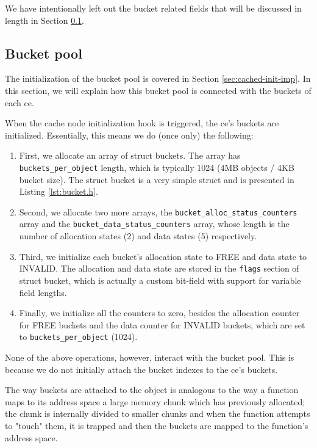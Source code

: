 We have intentionally left out the bucket related fields that will be discussed 
in length in Section \ref{sec:cached-bucket-imp}.

\subsection{Bucket pool}\label{sec:cached-bucket-imp}

The initialization of the bucket pool is covered in Section 
\ref{sec:cached-init-imp}. In this section, we will explain how this bucket 
pool is connected with the buckets of each ce.

When the cache node initialization hook is triggered, the ce's buckets are 
initialized. Essentially, this means we do (once only) the following:

\begin{enumerate}
	\item First, we allocate an array of struct buckets. The array has
		\texttt{buckets\_per\_object} length, which is typically 1024 
		(4MB objects / 4KB bucket size). The struct bucket is a very 
		simple struct and is presented in Listing 
		\ref{lst:bucket.h}.
		

	\item Second, we allocate two more arrays, the  
		\texttt{bucket\_alloc\_status\_counters} array and the
		\texttt{bucket\_data\_status\_counters} array, whose length is 
		the number of allocation states (2) and data states (5) 
		respectively.
	\item Third, we initialize each bucket's allocation state to FREE and 
		data state to INVALID. The allocation and data state are stored 
		in the \texttt{flags} section of struct bucket, which is 
		actually a custom bit-field with support for variable field 
		lengths.
	\item Finally, we initialize all the counters to zero, besides the 
		allocation counter for FREE buckets and the data counter for 
		INVALID buckets, which are set to \texttt{buckets\_per\_object} 
		(1024).
\end{enumerate}

None of the above operations, however, interact with the bucket pool. This is 
because we do not initially attach the bucket indexes to the ce's buckets.

The way buckets are attached to the object is analogous to the way a function 
maps to its address space a large memory chunk which has previously allocated; 
the chunk is internally divided to smaller chunks and when the function 
attempts to "touch" them, it is trapped and then the buckets are mapped to the 
function's address space.

